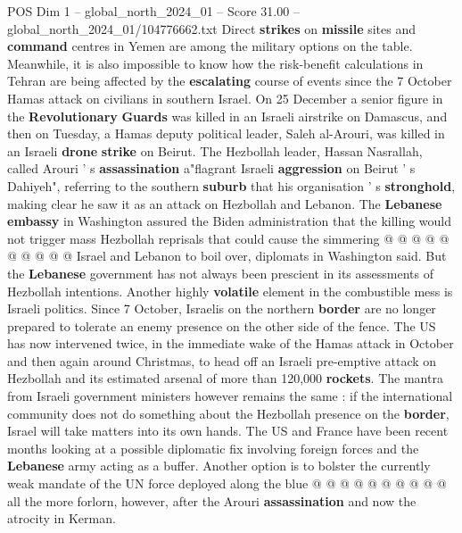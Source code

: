 \begin{textsample}{POS Dim 1 – global\_north\_2024\_01 – Score 31.00 – global\_north\_2024\_01/104776662.txt}
Direct \textbf{strikes} on \textbf{missile} sites and \textbf{command} centres in Yemen are among the military options on the table.
Meanwhile, it is also impossible to know how the risk-benefit calculations in Tehran are being affected by the \textbf{escalating} course of events since the 7 October Hamas attack on civilians in southern Israel.
On 25 December a senior figure in the \textbf{Revolutionary} \textbf{Guards} was killed in an Israeli airstrike on Damascus, and then on Tuesday, a Hamas deputy political leader, Saleh al-Arouri, was killed in an Israeli \textbf{drone} \textbf{strike} on Beirut.
The Hezbollah leader, Hassan Nasrallah, called Arouri ' s \textbf{assassination} a"flagrant Israeli \textbf{aggression} on Beirut ' s Dahiyeh", referring to the southern \textbf{suburb} that his organisation ' s \textbf{stronghold}, making clear he saw it as an attack on Hezbollah and Lebanon.
The \textbf{Lebanese} \textbf{embassy} in Washington assured the Biden administration that the killing would not trigger mass Hezbollah reprisals that could cause the simmering @ @ @ @ @ @ @ @ @ @ Israel and Lebanon to boil over, diplomats in Washington said.
But the \textbf{Lebanese} government has not always been prescient in its assessments of Hezbollah intentions.
Another highly \textbf{volatile} element in the combustible mess is Israeli politics.
Since 7 October, Israelis on the northern \textbf{border} are no longer prepared to tolerate an enemy presence on the other side of the fence.
The US has now intervened twice, in the immediate wake of the Hamas attack in October and then again around Christmas, to head off an Israeli pre-emptive attack on Hezbollah and its estimated arsenal of more than 120,000 \textbf{rockets}.
The mantra from Israeli government ministers however remains the same : if the international community does not do something about the Hezbollah presence on the \textbf{border}, Israel will take matters into its own hands.
The US and France have been recent months looking at a possible diplomatic fix involving foreign forces and the \textbf{Lebanese} army acting as a buffer.
Another option is to bolster the currently weak mandate of the UN force deployed along the blue @ @ @ @ @ @ @ @ @ @ all the more forlorn, however, after the Arouri \textbf{assassination} and now the atrocity in Kerman.

\end{textsample}
